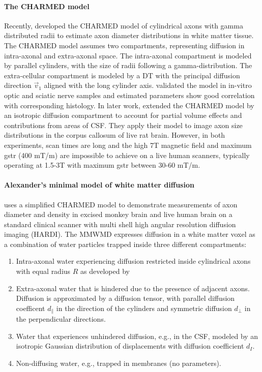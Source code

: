 \paragraph*{The CHARMED model} 
Recently, \citet{Assaf:2005} developed the CHARMED model of cylindrical axons with gamma distributed radii to estimate axon diameter distributions in white matter tissue. The CHARMED model assumes two compartments, representing diffusion in intra-axonal and extra-axonal space. The intra-axonal compartment is modeled by parallel cylinders, with the size of radii following a gamma-distribution. The extra-cellular compartment is modeled by a {\gls{DT}} with the principal diffusion direction $\vec{v}_1$ aligned with the long cylinder axis. \citet{Alexander:2008} validated the model in in-vitro optic and sciatic nerve samples and estimated parameters show good correlation with corresponding histology. In later work, \citet{Barazany:2009} extended the CHARMED model by an isotropic diffusion compartment to account for partial volume effects and contributions from areas of {\gls{CSF}}. They apply their model to image axon size distributions in the corpus callosum of live rat brain. However, in both experiments, scan times are long and the high 7T magnetic field and maximum {\gls{gstr}} (400 mT/m) are impossible to achieve on a live human scanners, typically operating at 1.5-3T with maximum {\gls{gstr}} between 30-60 mT/m.

\paragraph*{Alexander's minimal model of white matter diffusion} 
\label{par:alexanders_model}
\citet{Alexander:2010} uses a simplified CHARMED model to demonstrate measurements of axon diameter and density in excised monkey brain and live human brain on a standard clinical scanner with multi shell high angular resolution diffusion imaging (HARDI). The \gls{MMWMD} expresses diffusion in a white matter voxel as a combination of water particles trapped inside three different compartments: 
\begin{enumerate}
  \item Intra-axonal water experiencing diffusion restricted inside cylindrical axons with equal radius $R$ as developed by \citet{Gelderen:1994}
  \item Extra-axonal water that is hindered due to the presence of adjacent axons. Diffusion is approximated by a diffusion tensor, with parallel diffusion coefficent $d_\parallel$ in the direction of the cylinders and symmetric diffusion $d_\perp$ in the perpendicular directions.
  \item Water that experiences unhindered diffusion, e.g., in the {\gls{CSF}}, modeled by an isotropic Gaussian distribution of displacements with diffusion coefficient $d_{I}$.
  \item Non-diffusing water, e.g., trapped in membranes (no parameters).
\end{enumerate}
  
